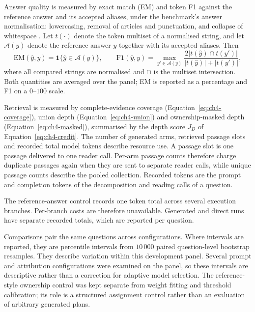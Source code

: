 Answer quality is measured by exact match (EM) and token F1 against the
reference answer and its accepted aliases, under the benchmark's answer
normalisation: lowercasing, removal of articles and punctuation, and collapse
of whitespace \cite{trivedi2022musique}. Let $t(\cdot)$ denote the token
multiset of a normalised string, and let $\mathcal{A}(y)$ denote the reference
answer $y$ together with its accepted aliases. Then
\begin{equation}
  \mathrm{EM}(\widehat y,y)=\mathbf{1}\{\widehat y\in\mathcal{A}(y)\},
  \qquad
  \mathrm{F1}(\widehat y,y)=\max_{y'\in\mathcal{A}(y)}
    \frac{2\lvert t(\widehat y)\cap t(y')\rvert}
         {\lvert t(\widehat y)\rvert+\lvert t(y')\rvert},
  \label{eq:ch4-answer}
\end{equation}
where all compared strings are normalised and $\cap$ is the multiset
intersection. Both quantities are averaged over the panel; EM is reported as a
percentage and F1 on a $0$--$100$ scale.

Retrieval is measured by complete-evidence coverage
(Equation~\ref{eq:ch4-coverage}), union depth (Equation~\ref{eq:ch4-union})
and ownership-masked depth (Equation~\ref{eq:ch4-masked}), summarised by the
depth score $J_D$ of Equation~\ref{eq:ch4-credit}. The number of generated arms, retrieved passage
slots and recorded total model tokens describe resource use. A passage slot is
one passage delivered to one reader call. Per-arm passage counts therefore
charge duplicate passages again when they are sent to separate reader calls,
while unique passage counts describe the pooled collection. Recorded tokens are
the prompt and completion tokens of the decomposition and reading calls of a
question.

The reference-answer control records one token total across several execution
branches. Per-branch costs are therefore unavailable. Generated and direct runs
have separate recorded totals, which are reported per question.

Comparisons pair the same questions across configurations. Where intervals are
reported, they are percentile intervals from $10\,000$ paired question-level
bootstrap resamples. They describe variation within this development panel.
Several prompt and attribution configurations were examined on the panel, so
these intervals are descriptive rather than a correction for adaptive model
selection. The reference-style ownership control was kept separate from weight fitting
and threshold calibration; its role is a structured assignment control rather
than an evaluation of arbitrary generated plans.

